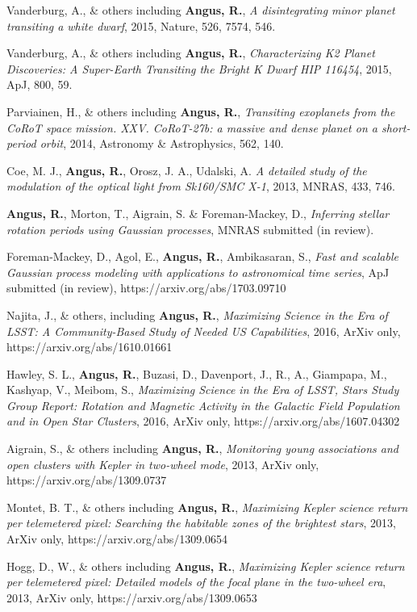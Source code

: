 \documentclass[12pt,letterpaper]{article}
\begin{document}
\begin{list}{}{\cvlist}
\item
    Vanderburg, A., \& others including {\bf Angus, R.},
    {\it A disintegrating minor planet transiting a white dwarf}, 2015,
    Nature, 526, 7574, 546.
\item
Vanderburg, A., \& others including {\bf Angus, R.},
    {\it Characterizing K2 Planet Discoveries: A Super-Earth Transiting the
    Bright K Dwarf HIP 116454}, 2015, ApJ, 800, 59.
\item
Parviainen, H., \& others including {\bf Angus, R.},
    {\it Transiting exoplanets from the CoRoT space mission. XXV. CoRoT-27b: a
    massive and dense planet on a short-period orbit}, 2014, Astronomy \&
    Astrophysics, 562, 140.
\item
    Coe, M. J., {\bf Angus, R.}, Orosz, J. A., Udalski, A. {\it A detailed
    study of the modulation of the optical light from Sk160/SMC X-1}, 2013,
    MNRAS, 433, 746.
\end{list}

\begin{list}{}{\cvlist}
\item
    {\bf Angus, R.}, Morton, T., Aigrain, S. \& Foreman-Mackey, D., {\it
    Inferring stellar rotation periods using Gaussian processes}, MNRAS
    submitted (in review).
\item
    Foreman-Mackey, D., Agol, E., {\bf Angus, R.}, Ambikasaran, S., {\it Fast
    and scalable Gaussian process modeling with applications to astronomical
    time series}, ApJ submitted (in review), https://arxiv.org/abs/1703.09710
\item
    Najita, J., \& others, including {\bf Angus, R.}, {\it Maximizing Science
    in the Era of LSST: A Community-Based Study of Needed US Capabilities},
    2016, ArXiv only, https://arxiv.org/abs/1610.01661
\item
    Hawley, S. L., {\bf Angus, R.}, Buzasi, D., Davenport, J., R., A.,
    Giampapa, M., Kashyap, V., Meibom, S., {\it Maximizing Science in the Era
    of LSST, Stars Study Group Report: Rotation and Magnetic Activity in the
    Galactic Field Population and in Open Star Clusters}, 2016, ArXiv only,
    https://arxiv.org/abs/1607.04302
\item
    Aigrain, S., \& others including {\bf Angus, R.},
    {\it Monitoring young associations and open clusters with
    Kepler in two-wheel mode}, 2013, ArXiv only,
    https://arxiv.org/abs/1309.0737
\item
    Montet, B. T., \& others including {\bf Angus, R.},
    {\it Maximizing Kepler science return per telemetered pixel: Searching the
    habitable zones of the brightest stars}, 2013, ArXiv only,
    https://arxiv.org/abs/1309.0654
\item
    Hogg, D., W., \& others including {\bf Angus, R.},
    {\it Maximizing Kepler science return per telemetered pixel: Detailed
    models of the focal plane in the two-wheel era}, 2013, ArXiv only,
    https://arxiv.org/abs/1309.0653
\end{list}
\end{document}
